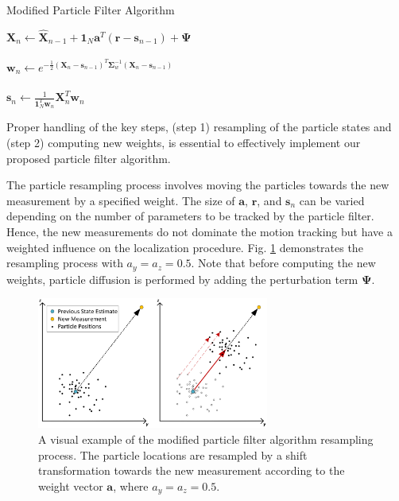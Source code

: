 \documentclass[10pt,journal,final]{IEEEtran}
\begin{document}
\begin{algorithm}[h] 
\renewcommand{\thealgocf}{}
	\label{algo:particle_filter}
	\caption{Modified Particle Filter Algorithm}
	\SetAlgoLined
	
	
	$\mathbf{X}_n \xleftarrow[]{} \mathbf{\hat{X}}_{n-1} + \mathbf{1}_N \mathbf{a}^T (\mathbf{r} - \mathbf{s}_{n-1}) + \mathbf{\Psi}$ 
	
	$\mathbf{w}_n \xleftarrow[]{} e^{-\frac{1}{2}(\mathbf{X}_n-\mathbf{s}_{n-1})^T\mathbf{\Sigma}_w^{-1}(\mathbf{X}_n-\mathbf{s}_{n-1})}$
	
	$\mathbf{s}_n \xleftarrow[]{} \frac{1}{\mathbf{1}_N^T \mathbf{w}_n} \mathbf{X}_n^T \mathbf{w}_n$ 
\end{algorithm}

Proper handling of the key steps, (step 1) resampling of the particle states and (step 2) computing new weights, is essential to effectively implement our proposed particle filter algorithm. 

The particle resampling process involves moving the particles towards the new measurement by a specified weight.
The size of $\mathbf{a}$, $\mathbf{r}$, and $\mathbf{s}_n$ can be varied depending on the number of parameters to be tracked by the particle filter.
Hence, the new measurements do not dominate the motion tracking but have a weighted influence on the localization procedure. 
Fig. \ref{fig:particle_filter} demonstrates the resampling process with $a_y = a_z = 0.5$.
Note that before computing the new weights, particle diffusion is performed by adding the perturbation term $\mathbf{\Psi}$.

\begin{figure}[h]
	\centering
	\includegraphics[width=3in]{smith2.png}
	\caption{A visual example of the modified particle filter algorithm resampling process. The particle locations are resampled by a shift transformation towards the new measurement according to the weight vector $\mathbf{a}$, where $a_y = a_z = 0.5$.}
	\label{fig:particle_filter}
\end{figure}
\end{document}
